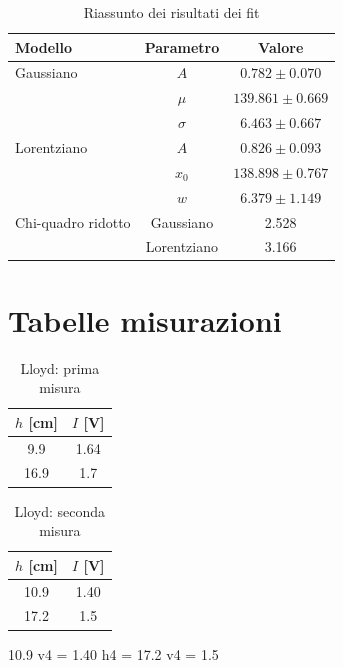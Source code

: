 \documentclass[letterpaper,12pt]{article}
\begin{document}
\begin{table}[h!]
    \centering
    \caption{Riassunto dei risultati dei fit}
    \label{tab:fit_results}
    \begin{tabular}{|l|c|c|}
        \hline
        \textbf{Modello} & \textbf{Parametro} & \textbf{Valore} \\
        \hline
        Gaussiano & $A$ & $0.782 \pm 0.070$ \\
                  & $\mu$ & $139.861 \pm 0.669$ \\
                  & $\sigma$ & $6.463 \pm 0.667$ \\
        \hline
        Lorentziano & $A$ & $0.826 \pm 0.093$ \\
                    & $x_0$ & $138.898 \pm 0.767$ \\
                    & $w$ & $6.379 \pm 1.149$ \\
        \hline
        Chi-quadro ridotto & Gaussiano & 2.528 \\
                            & Lorentziano & 3.166 \\
        \hline
    \end{tabular}
\end{table}
\newpage
\section{Tabelle misurazioni}

\begin{table}[h!]
	\centering
	\caption{Lloyd: prima misura}
	\label{tab:lloyd1}
	\begin{tabular}{|c|c|}
		\hline
		$h$ [cm] & $I$ [V] \\
		\hline
		9.9      & 1.64    \\
		16.9     & 1.7     \\
		\hline
	\end{tabular}
\end{table}

\begin{table}[h!]
	\centering
	\caption{Lloyd: seconda misura}
	\label{tab:lloyd2}
	\begin{tabular}{|c|c|}
		\hline
		$h$ [cm] & $I$ [V] \\
		\hline
		10.9     & 1.40    \\
		17.2     & 1.5     \\
		\hline
	\end{tabular}
\end{table}

10.9
v4 = 1.40
h4 = 17.2
v4 = 1.5
\end{document}
